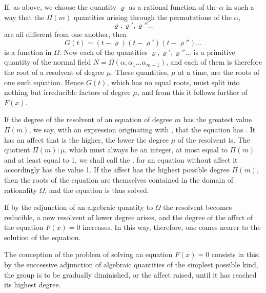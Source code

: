 
If, as above, we choose the quantity $\varrho$ as a rational function of the $\alpha$ in such a way that the $\Pi(m)$ quantities arising through the permutations of the $\alpha$,
\[
\varrho, \varrho', \varrho'' \ldots
\]
are all different from one another, then
\[
G(t) = (t - \varrho)(t - \varrho')(t - \varrho'') \ldots
\]
is a function in $\Omega$. Now each of the quantities $\varrho, \varrho', \varrho'' \ldots$ is a primitive quantity of the normal field $N = \Omega(\alpha, \alpha_1 \ldots \alpha_{m-1})$, and each of them is therefore the root of a  resolvent of degree $\mu$. These quantities, $\mu$ at a time, are the roots of one such equation. Hence $G(t)$, which has no equal roots, must split into nothing but irreducible factors of degree $\mu$, and from this it follows further  of $F(x)$.

If the degree of the  resolvent of an equation of degree $m$ has the greatest value $\Pi(m)$, we say, with an expression originating with , that the equation has . It has an affect that is the higher, the lower the degree $\mu$ of the  resolvent is. The quotient $\Pi(m) : \mu$, which must always be an integer, at most equal to $\Pi(m)$ and at least equal to 1, we shall call the ; for an equation without affect it accordingly has the value 1. If the affect has the highest possible degree $\Pi(m)$, then the roots of the equation are themselves contained in the domain of rationality $\Omega$, and the equation is thus solved.

If by the adjunction of an algebraic quantity to $\Omega$ the  resolvent becomes reducible, a new resolvent of lower degree arises, and the degree of the affect of the equation $F(x) = 0$ increases. In this way, therefore, one comes nearer to the solution of the equation.

The  conception of the problem of solving an equation $F(x) = 0$ consists in this: by the successive adjunction of algebraic quantities of the simplest possible kind, the group is to be gradually diminished, or the affect raised, until it has reached its highest degree.

\begin{quote}
\end{quote}
